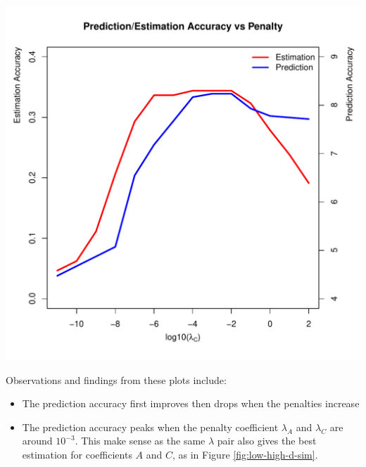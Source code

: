 \documentclass[fleqn]{article}
\let\oldref\ref
\renewcommand{\ref}[1]{(\oldref{#1})}
\begin{document}
\begin{center}
\includegraphics[scale=0.7]{./figures/est-pred-accuracy.pdf}
\label{fig:estpredaccuracy}
\end{center}


Observations and findings from these plots include:
\begin{itemize}
 \item The prediction accuracy first improves then drops when the penalties increase
 \item The prediction accuracy peaks when the penalty coefficient $\lambda_A$ and $\lambda_C$ are around $10^{-3}$. This make sense as the same $\lambda$ pair also gives the best estimation for coefficients $A$ and $C$, as in Figure \oldref{fig:low-high-d-sim}.
\end{itemize}
\end{document}
